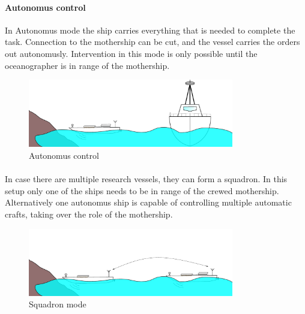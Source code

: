 \paragraph{Autonomus control}
In Autonomus mode the ship carries everything that is needed to complete the task. Connection to the mothership can be cut, and the vessel carries the orders out autonomusly. Intervention in this mode is only possible until the oceanographer is in range of the mothership.

\begin{figure}[H]
	\centering
	\includegraphics[width=0.8\textwidth]{img/autonomus}
	\caption{Autonomus control}
	\label{fig:autonomus}
\end{figure}

\paragraph{}
In case there are multiple research vessels, they can form a squadron. In this setup only one of the ships needs to be in range of the crewed mothership. Alternatively one autonomus ship is capable of controlling multiple automatic crafts, taking over the role of the mothership.

\begin{figure}[H]
	\centering
	\includegraphics[width=0.8\textwidth]{img/multiple}
	\caption{Squadron mode}
	\label{fig:multiple}
\end{figure}

